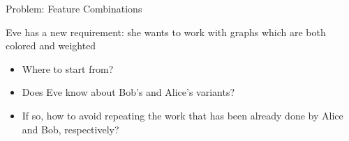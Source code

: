 \begin{frame}{Problem: Feature Combinations}
	~

	\begin{mycolumns}[widths={42}]
		\begin{example}{}
			Eve has a new requirement:
			she wants to work with graphs which are both colored and weighted
		\end{example}
	\mynextcolumn
		\begin{note}{}
			\begin{itemize}
				\item Where to start from?
				\item Does Eve know about Bob's and Alice's variants?
				\item If so, how to avoid repeating the work that has been already done by Alice and Bob, respectively?
			\end{itemize}
		\end{note}
	\end{mycolumns}

	~

\end{frame}

